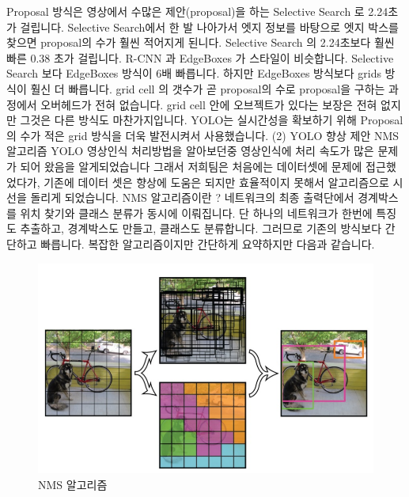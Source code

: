 \documentclass{article}
\begin{document}
Proposal 방식은 영상에서 수많은 제안(proposal)을 하는 Selective Search 로 2.24초가 걸립니다.
\newline Selective Search에서 한 발 나아가서 엣지 정보를 바탕으로 엣지 박스를 찾으면 proposal의 수가 훨씬 적어지게 된니다.
Selective Search 의 2.24초보다 훨씬 빠른 0.38 초가 걸립니다. 
R-CNN 과 EdgeBoxes 가 스타일이 비슷합니다.
\newline Selective Search 보다 EdgeBoxes 방식이 6배 빠릅니다.
하지만 EdgeBoxes 방식보다 grids 방식이 훨신 더 빠릅니다.
\newline grid cell 의 갯수가 곧 proposal의 수로 proposal을 구하는 과정에서 오버헤드가 전혀 없습니다.
grid cell 안에 오브젝트가 있다는 보장은 전혀 없지만 그것은 다른 방식도 마찬가지입니다.
\newline YOLO는 실시간성을 확보하기 위해 Proposal의 수가 적은 grid 방식을 더욱 발전시켜서 사용했습니다.
\newline
\newline (2) YOLO 향상 제안 NMS 알고리즘
 YOLO 영상인식 처리방법을 알아보던중 영상인식에 처리 속도가 많은 문제가 되어 왔음을 알게되었습니다 그래서 저희팀은 처음에는 데이터셋에 문제에 접근했었다가, 기존에 데이터 셋은 향상에 도움은 되지만 효율적이지 못해서 알고리즘으로 시선을 돌리게 되었습니다.
\newline
\newline NMS 알고리즘이란 ?
\newline 네트워크의 최종 출력단에서 경계박스를 위치 찾기와 클래스 분류가 동시에 이뤄집니다.
단 하나의 네트워크가 한번에 특징도 추출하고, 경계박스도 만들고, 클래스도 분류합니다.  그러므로 기존의 방식보다 간단하고 빠릅니다.
복잡한 알고리즘이지만 간단하게 요약하지만 다음과 같습니다.

\begin{figure}[h!]
\centering
\includegraphics[scale=1.0]{enhanceyolo3.jpg}
\caption{ NMS 알고리즘 }
\label{fig:detect}
\end{figure}
\end{document}
